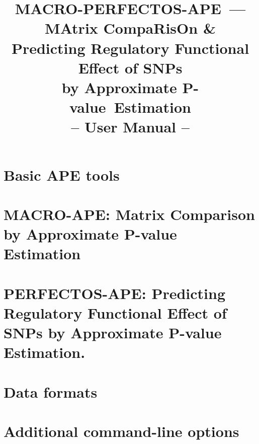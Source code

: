 \documentclass[draft]{article}
\newcommand*{\pvalue}{\mbox{P-value}}
\begin{document}
\title{
MACRO-PERFECTOS-APE~---\\{\small MAtrix CompaRisOn \&\\ Predicting Regulatory Functional Effect of SNPs\\ by Approximate \pvalue\ Estimation}\\
-- User Manual --
}
\maketitle








\section{Basic APE tools}







\section{MACRO-APE: Matrix Comparison by Approximate P-value Estimation}






\section{PERFECTOS-APE: Predicting Regulatory Functional Effect of SNPs by Approximate P-value Estimation.}





\section{Data formats}




\section{Additional command-line options}


\end{document}
